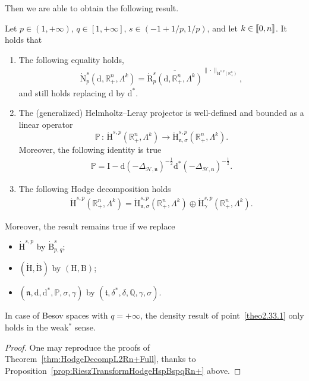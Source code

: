 \documentclass[AHL,Unicode,longabstracts,published]{cedram}
\newcommand{\bbP}{\mathbb{P}}
\newcommand{\bbR}{\mathbb{R}}
\newcommand{\bbQ}{\mathbb{Q}}
\newcommand{\rmH}{\mathrm{H}}%
\newcommand{\rmB}{\mathrm{B}}
\newcommand{\rmd}{\mathrm{d}}
\newcommand{\rmR}{\mathrm{R}}
\newcommand{\rmN}{\mathrm{N}}
\newcommand{\rmI}{\mathrm{I}}
\newcommand{\clH}{\mathcal{H}}
\newcommand{\fkn}{\mathfrak{n}}
\newcommand{\fkt}{\mathfrak{t}}
\newcommand{\llbracket}{\mathopen{[\mkern -2.7mu[}}
\newcommand{\rrbracket}{\mathclose{]\mkern -2.7mu]}}
\newcommand{\llb}{\llbracket}
\newcommand{\rrb}{\rrbracket}
\newcommand*{\romanenumi}{\renewcommand*{\theenumi}{\roman{enumi}}}
\begin{document}
Then we are able to obtain the following result.

\begin{theo}\label{thm:HodgeDecompRn+}
Let $p\in(1,+\infty)$, $q\in[1,+\infty]$, $s\in(-1+1/p,1/p)$, and let $k\in\llb 0,n\rrb$. It holds that
\begin{enumerate}\romanenumi
\item\label{theo2.33.1} The following equality holds,
\begin{align*}
\dot{\rmN}^{s}_{p}\left(\rmd,\bbR^n_+,\Lambda^k\right) = \overline{\dot{\rmR}^{s}_{p}\left(\rmd,\bbR^n_+,\Lambda^k\right)}^{\|\cdot\|_{\dot{\rmH}^{s,p}\left(\bbR^n_+\right)}},
\end{align*}
and still holds replacing $\rmd$ by $\rmd^\ast$.

\item\label{theo2.33.2} The (generalized) Helmholtz--Leray projector is well-defined and bounded as a linear operator
\[
\bbP\,:\, \dot{\rmH}^{s,p}\left(\bbR^n_+,\Lambda^k\right)\longrightarrow \dot{\rmH}^{s,p}_{{\fkn},\sigma}\left(\bbR^n_+,\Lambda^k\right).
\]
Moreover, the following identity is true
\begin{align*}
\bbP = \rmI  - \rmd\left(-\Delta_{\clH,\fkn}\right)^{-\frac{1}{2}}\rmd^\ast\left(-\Delta_{\clH,\fkn}\right)^{-\frac{1}{2}} .
\end{align*}

\item\label{theo2.33.3} The following Hodge decomposition holds
\begin{align*}
\dot{\rmH}^{s,p}\left(\bbR^n_+,\Lambda^k\right) = \dot{\rmH}^{s,p}_{{\fkn},\sigma}\left(\bbR^n_+,\Lambda^k\right) \oplus \dot{\rmH}^{s,p}_{\gamma}\left(\bbR^n_+,\Lambda^k\right).
\end{align*}
\end{enumerate}
Moreover, the result remains true if we replace
\begin{itemize}
\item $\dot{\rmH}^{s,p}$ by $\dot{\rmB}^{s}_{p,q}$;
\item $(\dot{\rmH},\dot{\rmB})$ by $({\rmH},{\rmB})$;
\item $(\fkn,\rmd,\rmd^\ast,\bbP,\sigma,\gamma)$ by $(\fkt,\delta^\ast,\delta,\bbQ,\gamma,\sigma)$.
\end{itemize}
In case of Besov spaces with $q=+\infty$, the density result of point~\eqref{theo2.33.1} only holds in the weak${}^\ast$ sense.
\end{theo}


\begin{proof}
One may reproduce the proofs of Theorem~\ref{thm:HodgeDecompL2Rn+Full}, thanks to Proposition~\ref{prop:RieszTransformHodgeHspBspqRn+} above.
\end{proof}
\end{document}
